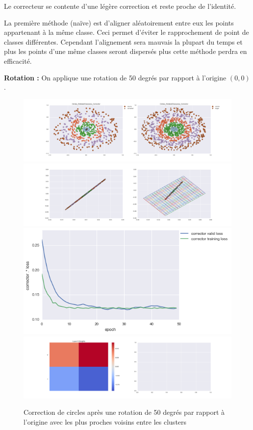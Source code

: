 Le correcteur se contente d'une légère correction et reste proche de l'identité.

La première méthode (naïve) est d'aligner aléatoirement entre eux les points appartenant à la même classe.
Ceci permet d'éviter le rapprochement de point de classes différentes. Cependant l'alignement sera mauvais
la plupart du temps et plus les points d'une même classes seront dispersés plus cette méthode perdra en efficacité.

{\Large \textbf{Rotation :}} On applique une rotation de 50 degrés par rapport à l'origine $(0,0)$.

\begin{figure}[H] %
\centering
\includegraphics[width=\linewidth]{fig/24-05-2016/circles/Circles_RotatedClasswise_Corrector-DATA.png}
\includegraphics[width=\linewidth]{fig/24-05-2016/circles/Circles_RotatedClasswise_Corrector-GridCheck.png}
\includegraphics[width=0.45\linewidth]{fig/24-05-2016/circles/Circles_RotatedClasswise_Corrector-Learning_curve.png}
\includegraphics[width=\linewidth]{fig/24-05-2016/circles/Circles_RotatedClasswise_Corrector-W.png}
\caption{Correction de circles après une rotation de 50 degrés par rapport à l'origine avec les plus proches voisins entre les clusters}
\label{fig:recap-circles-rot-classwise}
\end{figure}

